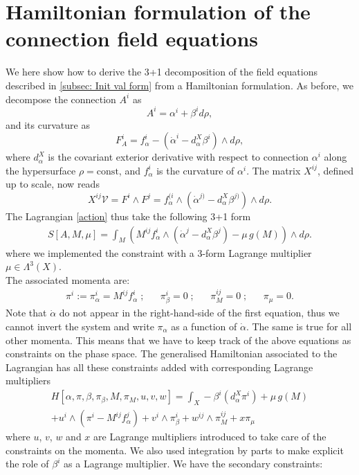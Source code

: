 \documentclass[a4paper,12pt]{article}
\newcommand{\W}{\wedge}
\newcommand{\be}{\begin{eqnarray}}
\newcommand{\ee}{\end{eqnarray}}
\begin{document}
\section{Hamiltonian formulation of the connection field equations}

We here show how to derive the 3+1 decomposition of the field equations described in \ref{subsec: Init val form} from a Hamiltonian formulation. As before, we decompose the connection $A^i$ as  
$$A^i=\alpha^i+\beta^id\rho,$$
and its curvature as
$$F_A^i=f_\alpha^i-(\dot\alpha^i-d^X_\alpha\beta^i)\wedge d\rho,$$
where $d^X_\alpha$ is the covariant exterior derivative with respect to connection $\alpha^i$ along the hypersurface $\rho=\text{const}$, and $f^i_\alpha$ is the curvature of $\alpha^i$. The matrix $X^{ij}$, defined up to scale, now reads
\[
X^{ij} {\mathcal V}= F^i \W F^j =  f_\alpha^{(i}\wedge (\dot\alpha^{j)}-d^X_\alpha\beta^{j)})\wedge d\rho.
 \]
The Lagrangian \eqref{action} thus take the following 3+1 form
\be
S[A,M,\mu] = \int_M \left( M^{ij} f_\alpha^{i} \wedge \left(  \dot\alpha^{j}-d^X_\alpha\beta^{j}\right) - \mu \, g(M) \right) \W d\rho.
\ee
where we implemented the constraint with a 3-form Lagrange multiplier $\mu \in \Lambda^3\left(X \right)$.\\
The associated momenta are:
\begin{align*}
\pi^i := \pi^i_{\alpha} = M^{ij} f^i_\alpha \;; & &
\pi^i_{\beta}=0 \;; & &
\pi^{ij}_M =0 \;; & & \pi_{\mu}=0.
\end{align*}
Note that $\dot{\alpha}$ do not appear in the right-hand-side of the first equation, thus we cannot invert the system and write $\pi_{\alpha}$ as a function of $\dot{\alpha}$. The same is true for all other momenta. This means that we have to keep track of the above equations as constraints on the phase space. The generalised Hamiltonian associated to the Lagrangian has all these constraints added with corresponding Lagrange multipliers
\begin{multline}
H[\alpha, \pi, \beta, \pi_{\beta}, M , \pi_M ,u,v,w] = \int_X -\beta^{i}\left( d^X_\alpha\pi^i \right)  + \mu \, g(M) \\ %
+ u^i \W  \left(\pi^i- M^{ij} f^j_\alpha\right) + v^i \W \pi^i_{\beta} + w^{ij} \W \pi^{ij}_M + x \pi_{\mu}
 \end{multline}
where $u$, $v$, $w$ and $x$ are Lagrange multipliers introduced to take care of the constraints on the momenta. We also used integration by parts to make explicit the role of $\beta^i$ as a Lagrange multiplier.
 We have the secondary constraints:
\end{document}
